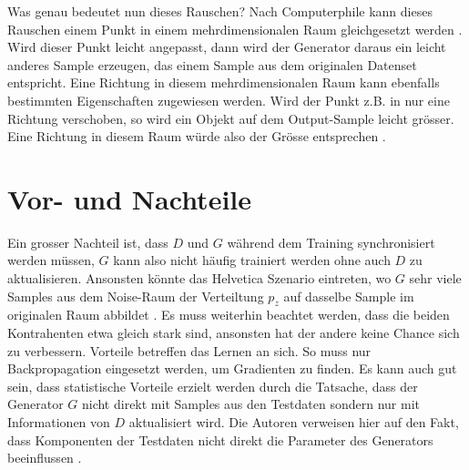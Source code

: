 \para
Was genau bedeutet nun dieses Rauschen? Nach \glqq Computerphile\grqq{} kann dieses Rauschen einem Punkt in einem
mehrdimensionalen Raum gleichgesetzt werden \cite[~t 16:45]{youtube:gan}. Wird dieser Punkt leicht angepasst, dann
wird der Generator daraus ein leicht anderes Sample erzeugen, das einem Sample aus dem originalen Datenset entspricht.
Eine Richtung in diesem mehrdimensionalen Raum kann ebenfalls bestimmten Eigenschaften zugewiesen werden. Wird der Punkt
z.B. in nur eine Richtung verschoben, so wird ein Objekt auf dem Output-Sample leicht grösser. Eine
Richtung in diesem Raum würde also der Grösse entsprechen \cite[~t 17:35]{youtube:gan}.

\section{Vor- und Nachteile}
Ein grosser Nachteil ist, dass $D$ und $G$ während dem Training synchronisiert werden müssen, $G$ kann also nicht
häufig trainiert werden ohne auch $D$ zu aktualisieren. Ansonsten könnte das \glqq Helvetica Szenario\grqq{} eintreten,
wo $G$ sehr viele Samples aus dem Noise-Raum der Verteiltung $p_z$ auf dasselbe Sample im originalen Raum abbildet \cite{8253599}.
Es muss weiterhin beachtet werden, dass die beiden Kontrahenten etwa gleich stark sind, ansonsten hat der andere keine
Chance sich zu verbessern.
\para
Vorteile betreffen das Lernen an sich. So muss nur \Gls{Backpropagation} eingesetzt werden, um Gradienten zu finden.
Es kann auch gut sein, dass statistische Vorteile erzielt werden durch die Tatsache, dass der Generator $G$ nicht direkt
mit Samples aus den Testdaten sondern nur mit Informationen von $D$ aktualisiert wird. Die Autoren verweisen hier auf
den Fakt, dass Komponenten der Testdaten nicht direkt die Parameter des Generators beeinflussen \cite{8253599}.